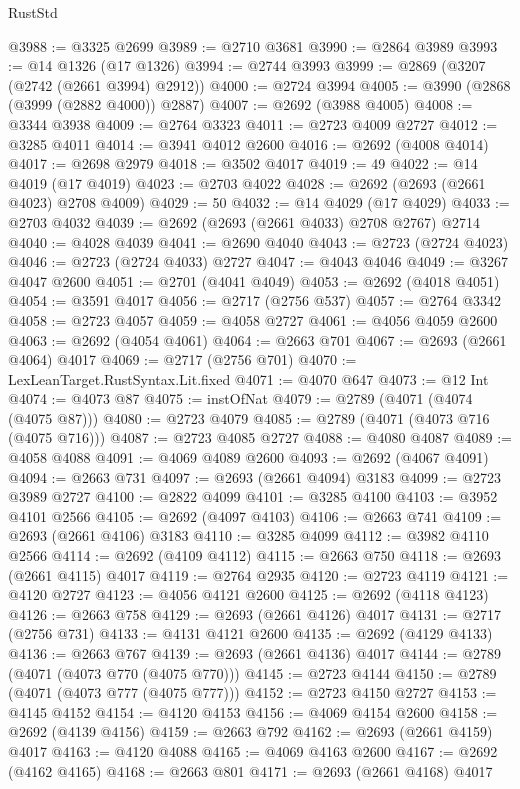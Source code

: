 \begin{lexlean}{RustStd}
\begin{coremodule}
{\begin{coremodule}
{{{{{{{{{{{{{{{{{{{{{{{{{{{{{{{{{{{{{{{@3988 := @3325 @2699
@3989 := @2710 @3681
@3990 := @2864 @3989
@3993 := @14 @1326 (@17 @1326)
@3994 := @2744 @3993
@3999 := @2869 (@3207 (@2742 (@2661 @3994) @2912))
@4000 := @2724 @3994
@4005 := @3990 (@2868 (@3999 (@2882 @4000)) @2887)
@4007 := @2692 (@3988 @4005)
@4008 := @3344 @3938
@4009 := @2764 @3323
@4011 := @2723 @4009 @2727
@4012 := @3285 @4011
@4014 := @3941 @4012 @2600
@4016 := @2692 (@4008 @4014)
@4017 := @2698 @2979
@4018 := @3502 @4017
@4019 := 49
@4022 := @14 @4019 (@17 @4019)
@4023 := @2703 @4022
@4028 := @2692 (@2693 (@2661 @4023) @2708 @4009)
@4029 := 50
@4032 := @14 @4029 (@17 @4029)
@4033 := @2703 @4032
@4039 := @2692 (@2693 (@2661 @4033) @2708 @2767) @2714
@4040 := @4028 @4039
@4041 := @2690 @4040
@4043 := @2723 (@2724 @4023)
@4046 := @2723 (@2724 @4033) @2727
@4047 := @4043 @4046
@4049 := @3267 @4047 @2600
@4051 := @2701 (@4041 @4049)
@4053 := @2692 (@4018 @4051)
@4054 := @3591 @4017
@4056 := @2717 (@2756 @537)
@4057 := @2764 @3342
@4058 := @2723 @4057
@4059 := @4058 @2727
@4061 := @4056 @4059 @2600
@4063 := @2692 (@4054 @4061)
@4064 := @2663 @701
@4067 := @2693 (@2661 @4064) @4017
@4069 := @2717 (@2756 @701)
@4070 := LexLeanTarget.RustSyntax.Lit.fixed
@4071 := @4070 @647
@4073 := @12 Int
@4074 := @4073 @87
@4075 := instOfNat
@4079 := @2789 (@4071 (@4074 (@4075 @87)))
@4080 := @2723 @4079
@4085 := @2789 (@4071 (@4073 @716 (@4075 @716)))
@4087 := @2723 @4085 @2727
@4088 := @4080 @4087
@4089 := @4058 @4088
@4091 := @4069 @4089 @2600
@4093 := @2692 (@4067 @4091)
@4094 := @2663 @731
@4097 := @2693 (@2661 @4094) @3183
@4099 := @2723 @3989 @2727
@4100 := @2822 @4099
@4101 := @3285 @4100
@4103 := @3952 @4101 @2566
@4105 := @2692 (@4097 @4103)
@4106 := @2663 @741
@4109 := @2693 (@2661 @4106) @3183
@4110 := @3285 @4099
@4112 := @3982 @4110 @2566
@4114 := @2692 (@4109 @4112)
@4115 := @2663 @750
@4118 := @2693 (@2661 @4115) @4017
@4119 := @2764 @2935
@4120 := @2723 @4119
@4121 := @4120 @2727
@4123 := @4056 @4121 @2600
@4125 := @2692 (@4118 @4123)
@4126 := @2663 @758
@4129 := @2693 (@2661 @4126) @4017
@4131 := @2717 (@2756 @731)
@4133 := @4131 @4121 @2600
@4135 := @2692 (@4129 @4133)
@4136 := @2663 @767
@4139 := @2693 (@2661 @4136) @4017
@4144 := @2789 (@4071 (@4073 @770 (@4075 @770)))
@4145 := @2723 @4144
@4150 := @2789 (@4071 (@4073 @777 (@4075 @777)))
@4152 := @2723 @4150 @2727
@4153 := @4145 @4152
@4154 := @4120 @4153
@4156 := @4069 @4154 @2600
@4158 := @2692 (@4139 @4156)
@4159 := @2663 @792
@4162 := @2693 (@2661 @4159) @4017
@4163 := @4120 @4088
@4165 := @4069 @4163 @2600
@4167 := @2692 (@4162 @4165)
@4168 := @2663 @801
@4171 := @2693 (@2661 @4168) @4017
}}}}}}}}}}}}}}}}}}}}}}}}}}}}}}}}}}}}}}}
\end{coremodule}}
\end{coremodule}
\end{lexlean}
